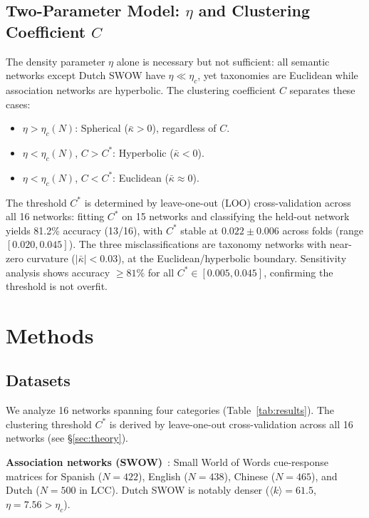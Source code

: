 \documentclass[11pt,a4paper]{article}
\newcommand{\kbar}{\bar{\kappa}}
\newcommand{\kavg}{\langle k \rangle}
\newcommand{\etac}{\eta_c}
\newcommand{\Cstar}{C^*}
\begin{document}
\subsection{Two-Parameter Model: $\eta$ and Clustering Coefficient $C$}

The density parameter $\eta$ alone is necessary but not sufficient: all semantic networks except Dutch SWOW have $\eta \ll \etac$, yet taxonomies are Euclidean while association networks are hyperbolic. The clustering coefficient $C$ separates these cases:
\begin{itemize}
    \item $\eta > \etac(N)$: Spherical ($\kbar > 0$), regardless of $C$.
    \item $\eta < \etac(N)$, $C > \Cstar$: Hyperbolic ($\kbar < 0$).
    \item $\eta < \etac(N)$, $C < \Cstar$: Euclidean ($\kbar \approx 0$).
\end{itemize}
The threshold $\Cstar$ is determined by leave-one-out (LOO) cross-validation across all 16 networks: fitting $\Cstar$ on 15 networks and classifying the held-out network yields 81.2\% accuracy (13/16), with $\Cstar$ stable at $0.022 \pm 0.006$ across folds (range $[0.020, 0.045]$). The three misclassifications are taxonomy networks with near-zero curvature ($|\kbar| < 0.03$), at the Euclidean/hyperbolic boundary. Sensitivity analysis shows accuracy $\geq 81\%$ for all $\Cstar \in [0.005, 0.045]$, confirming the threshold is not overfit.

\section{Methods}
\label{sec:methods}

\subsection{Datasets}

We analyze 16 networks spanning four categories (Table~\ref{tab:results}). The clustering threshold $\Cstar$ is derived by leave-one-out cross-validation across all 16 networks (see \S\ref{sec:theory}).

\textbf{Association networks (SWOW)}~\cite{deluca2024swow}: Small World of Words cue-response matrices for Spanish ($N=422$), English ($N=438$), Chinese ($N=465$), and Dutch ($N=500$ in LCC). Dutch SWOW is notably denser ($\kavg = 61.5$, $\eta = 7.56 > \etac$).
\end{document}

